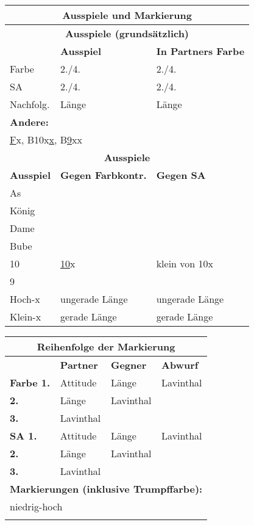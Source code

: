 \documentclass{article}
\begin{document}
\begin{multicols}{3}
\begin{tabularx}{\columnwidth}{|l|X|X|}
\hline \multicolumn{3}{c}{\bf \large Ausspiele und Markierung} \\

\hline \multicolumn{3}{c}{\bf Ausspiele (grundsätzlich)} \\
\hline           & {\bf Ausspiel} & {\bf In Partners Farbe} \\
\hline Farbe     & 2./4. & 2./4. \\
\hline SA        & 2./4. & 2./4. \\
\hline Nachfolg. & Länge & Länge \\
\hline \multicolumn{3}{|l|}{\bf Andere:} \\
       \multicolumn{3}{|l|}{\underline{F}x, B10x\underline{x}, B\underline{9}xx} \\

\hline \multicolumn{3}{c}{\bf Ausspiele} \\
\hline {\bf Ausspiel} & {\bf Gegen Farbkontr.} & {\bf Gegen SA} \\
\hline As       & & \\
\hline König    & & \\
\hline Dame     & & \\
\hline Bube     & & \\
\hline 10       & \underline{10}x & klein von 10x \\
\hline 9        & & \\
\hline Hoch-x   & ungerade Länge & ungerade Länge \\
\hline Klein-x  & gerade Länge & gerade Länge \\
\hline \end{tabularx}

\begin{tabularx}{\columnwidth}{|l|X|X|X|}
 \multicolumn{4}{c}{\bf Reihenfolge der Markierung} \\
\hline                & {\bf Partner} & {\bf Gegner} & {\bf Abwurf} \\
\hline \bf Farbe \hfill 1. & Attitude  & Länge     & Lavinthal \\
\hline \bf       \hfill 2. & Länge     & Lavinthal & \\
\hline \bf       \hfill 3. & Lavinthal &           & \\
\hline \bf SA    \hfill 1. & Attitude  & Länge     & Lavinthal \\
\hline \bf       \hfill 2. & Länge     & Lavinthal & \\
\hline \bf       \hfill 3. & Lavinthal &           & \\
\hline \multicolumn{4}{|l|}{\bf Markierungen (inklusive Trumpffarbe):} \\
       \multicolumn{4}{|l|}{niedrig-hoch} \\
       \multicolumn{4}{|l|}{} \\
\hline
\end{tabularx}


\end{multicols}
\end{document}
